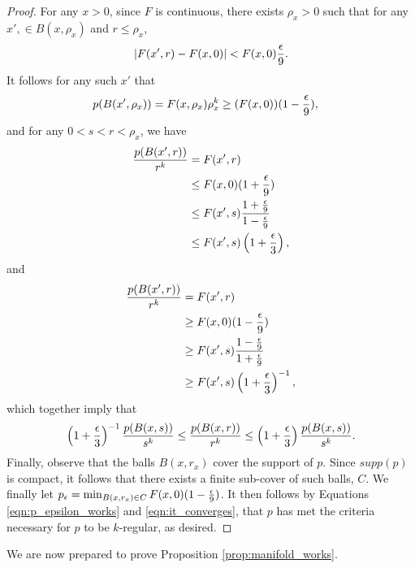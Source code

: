 \begin{proof}
For any $x > 0$, since $F$ is continuous, there exists $\rho_x > 0$ such that for any $x', \in B(x, \rho_x)$ and $r \leq \rho_x$, $$|F(x', r) - F(x, 0)| < F(x, 0)\frac{\epsilon}{9}.$$ It follows for any such $x'$ that 
\begin{equation}\label{eqn:p_epsilon_works}
\begin{split}
p(B(x', \rho_x)) &= F(x, \rho_x)\rho_x^k \geq (F(x, 0))(1- \frac{\epsilon}{9}),
\end{split}
\end{equation}
and for any $0 < s < r < \rho_x$, we have
\begin{equation*}
\begin{split}
\frac{p(B(x', r))}{r^k} &= F(x', r) \\
&\leq F(x, 0)(1 + \frac{\epsilon}{9}) \\
&\leq F(x', s)\frac{1 + \frac{\epsilon}{9}}{1 - \frac{\epsilon}{9}} \\ 
&\leq F(x', s)\left(1 + \frac{\epsilon}{3}\right),
\end{split}
\end{equation*}
and
\begin{equation*}
\begin{split}
\frac{p(B(x', r))}{r^k} &= F(x', r) \\
&\geq F(x, 0)(1 - \frac{\epsilon}{9}) \\
&\geq F(x', s)\frac{1 - \frac{\epsilon}{9}}{1 + \frac{\epsilon}{9}} \\ 
&\geq F(x', s)\left(1 +\frac{\epsilon}{3}\right)^{-1},
\end{split}
\end{equation*}
which together imply that 
\begin{equation}\label{eqn:it_converges}
\left(1 + \frac{\epsilon}{3}\right)^{-1} \frac{p(B(x, s))}{s^k} \leq \frac{p(B(x, r))}{r^k} \leq \left(1 + \frac{\epsilon}{3}\right)\frac{p(B(x, s))}{s^k}.
\end{equation}
Finally, observe that the balls $B(x, r_x)$ cover the support of $p$. Since $supp(p)$ is compact, it follows that there exists a finite sub-cover of such balls, $C$. We finally let $p_\epsilon = \min_{B(x, r_x) \in C} F(x, 0)(1 - \frac{\epsilon}{9})$. It then follows by Equations \ref{eqn:p_epsilon_works} and \ref{eqn:it_converges}, that $p$ has met the criteria necessary for $p$ to be $k$-regular, as desired. 
\end{proof}

We are now prepared to prove Proposition \ref{prop:manifold_works}. 


